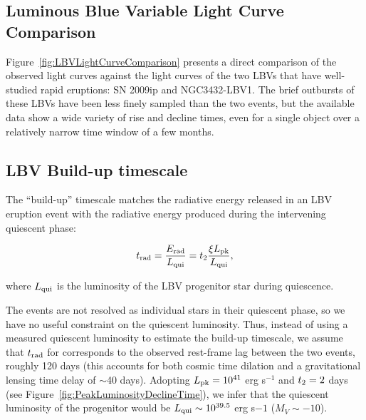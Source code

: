 \subsection{Luminous Blue Variable Light Curve Comparison}
\label{sec:LBVlightcurves}

Figure~\ref{fig:LBVLightCurveComparison} presents a direct comparison
of the observed \spock light curves against the light curves of the
two LBVs that have well-studied rapid eruptions: SN 2009ip and
NGC3432-LBV1. The brief outbursts of these LBVs have been less finely
sampled than the two \spock events, but the available data show a wide
variety of rise and decline times, even for a single object over a
relatively narrow time window of a few months.



\subsection{LBV Build-up timescale}\label{sec:LBVbuildup}

The ``build-up'' timescale \citep{Smith:2011b} matches the radiative
energy released in an LBV eruption event with the radiative energy
produced during the intervening quiescent phase:

\begin{equation}
  \label{eqn:trad}
t_{\rm rad} = \frac{E_{\rm rad}}{L_{\rm qui}} = \t2 \frac{\xi\Lpk}{L_{\rm qui}},
\end{equation}

\noindent where $L_{\rm qui}$ is the luminosity of the LBV progenitor
star during quiescence.

The \spock events are not resolved as individual stars in their
quiescent phase, so we have no useful constraint on the quiescent
luminosity. Thus, instead of using a measured quiescent luminosity to
estimate the build-up timescale, we assume that $t_{\rm rad}$ for
\spock corresponds to the observed rest-frame lag between the two
events, roughly 120 days (this accounts for both cosmic time dilation
and a gravitational lensing time delay of $\sim$40 days). Adopting
$L_{\rm pk}=10^{41}$ erg s$^{-1}$ and $\t2=2$ days (see
Figure~\ref{fig:PeakLuminosityDeclineTime}), we infer that the
quiescent luminosity of the \spock progenitor would be $L_{\rm
  qui}\sim10^{39.5}$ erg s${-1}$ ($M_V\sim-10$).


